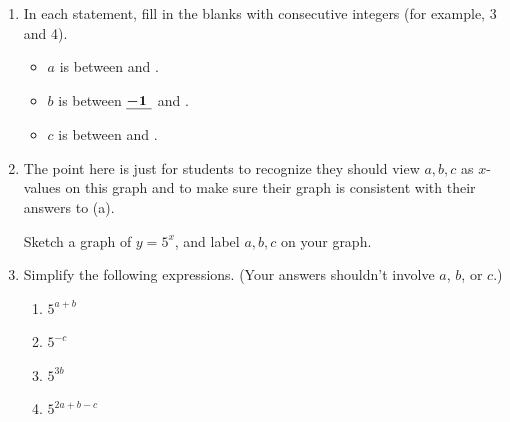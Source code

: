 \documentclass{article}
\begin{document}
\begin{enumerate}
  \begin{enumerate}
  \item
    \begin{problem}[\stretch{0.25}]
      In each statement, fill in the blanks with consecutive integers (for example, 3 and 4).
      \begin{itemize}
      \item $a$ is between  and .
      \item $b$ is between $\fitb{0.25in}{-1}$ and .
      \item $c$ is between  and .        
      \end{itemize}
    \end{problem}

  \item

    \begin{workshop}
      The point here is just for students to recognize they should view $a, b, c$ as $x$-values on this graph and to make sure their graph is consistent with their answers to (a). 
    \end{workshop}

    \begin{problem}[\vfill]
      Sketch a graph of $y = 5^x$, and label $a, b, c$ on your graph. 
    \end{problem}

  \item
    Simplify the following expressions. (Your answers shouldn't involve $a$, $b$, or $c$.)

    \begin{enumerate}
    \item
      \begin{problem}[\stretch{0.35}]
        $5^{a + b}$
      \end{problem}

    \item
      \begin{problem}[\stretch{0.35}]
        $5^{-c}$
      \end{problem}

    \item
      \begin{problem}[\stretch{0.35}]
        $5^{3b}$
      \end{problem}

    \item
      \begin{problem}[\nstretch{0.35}]
        $5^{2a + b - c}$
      \end{problem}


\end{enumerate}
\end{enumerate}
\end{enumerate}
\end{document}
